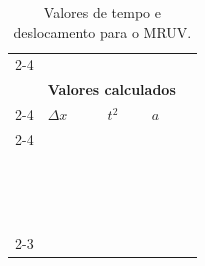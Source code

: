 \begin{table}[!ht]
\begin{tabular}{lp{25mm}p{25mm}p{25mm}l}
	\cmidrule{2-4}
\\
	& \multicolumn{3}{l}{\textbf{Valores calculados}} \\
	\cmidrule{2-4}
	& $\Delta x$ & $t^2$ & $a$\\
	\cmidrule{2-4}
	& \cellcolor[gray]{0.89} & \cellcolor[gray]{0.92} & \cellcolor[gray]{0.89} \\
	& \cellcolor[gray]{0.95} & \cellcolor[gray]{0.97} & \cellcolor[gray]{0.95} \\
	& \cellcolor[gray]{0.89} & \cellcolor[gray]{0.92} & \cellcolor[gray]{0.89} \\
	& \cellcolor[gray]{0.95} & \cellcolor[gray]{0.97} & \cellcolor[gray]{0.95} \\
	& \cellcolor[gray]{0.89} & \cellcolor[gray]{0.92} & \cellcolor[gray]{0.89} \\
	& \cellcolor[gray]{0.95} & \cellcolor[gray]{0.97} & \cellcolor[gray]{0.95} \\
	& \cellcolor[gray]{0.89} & \cellcolor[gray]{0.92} & \cellcolor[gray]{0.89} \\
	& \cellcolor[gray]{0.95} & \cellcolor[gray]{0.97} & \cellcolor[gray]{0.95} \\
	& \cellcolor[gray]{0.89} & \cellcolor[gray]{0.92} & \cellcolor[gray]{0.89} \\
	& \cellcolor[gray]{0.95} & \cellcolor[gray]{0.97} & \cellcolor[gray]{0.95} \\
	& \cellcolor[gray]{0.89} & \cellcolor[gray]{0.92} & \cellcolor[gray]{0.89} \\
	& \cellcolor[gray]{0.95} & \cellcolor[gray]{0.97} & \cellcolor[gray]{0.95} \\
	& \cellcolor[gray]{0.89} & \cellcolor[gray]{0.92} & \cellcolor[gray]{0.89} \\
	& \cellcolor[gray]{0.95} & \cellcolor[gray]{0.97} & \cellcolor[gray]{0.95} \\
	& \cellcolor[gray]{0.89} & \cellcolor[gray]{0.92} & \cellcolor[gray]{0.89} \\
	& \cellcolor[gray]{0.95} & \cellcolor[gray]{0.97} & \cellcolor[gray]{0.95} \\
	\cmidrule{2-3}
\bottomrule
\end{tabular}
\caption{Valores de tempo e deslocamento para o MRUV.}
\label{TabelaDadosLeisDeNewton}
\end{table}
